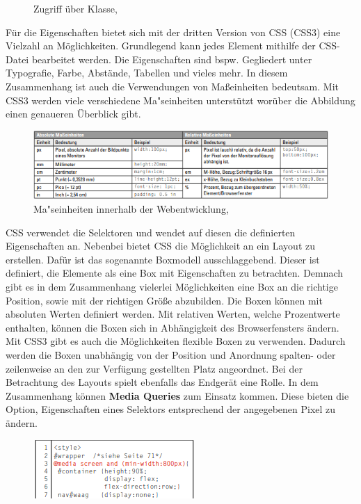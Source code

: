 \documentclass[a4paper,titlepage,halfparskip,12pt]{scrreprt}
\begin{document}
\begin{onehalfspacing}
\begin{figure}[h]
\begin{minipage}[c]{.4\textwidth}
		\caption{Zugriff über Klasse, \cite{buhler2017html5}} %
		\label{img:CSSClass}
	\end{minipage}
\end{figure}
Für die Eigenschaften bietet sich mit der dritten Version von \ac{CSS} (\ac{CSS}3) eine Vielzahl an Möglichkeiten. Grundlegend kann jedes Element mithilfe der \ac{CSS}-Datei bearbeitet werden. Die Eigenschaften sind bspw. Gegliedert unter Typografie, Farbe, Abstände, Tabellen und vieles mehr. In diesem Zusammenhang ist auch die Verwendungen von Maßeinheiten bedeutsam. Mit \ac{CSS}3 werden viele verschiedene Ma"seinheiten unterstützt worüber die Abbildung einen genaueren Überblick gibt.
\begin{figure}[h]
	\centering
	\includegraphics[scale=1.8]{images/CSSmasseinheiten}
	\caption{Ma"seinheiten innerhalb der Webentwicklung, \cite{buhler2017html5}} 
	\label{img:CSSmasseinheiten}
\end{figure}
\ac{CSS} verwendet die Selektoren und wendet auf diesen die definierten Eigenschaften an. Nebenbei bietet \ac{CSS} die Möglichkeit an ein Layout zu erstellen. Dafür ist das sogenannte Boxmodell ausschlaggebend. Dieser ist definiert, die Elemente als eine Box mit Eigenschaften zu betrachten. Demnach gibt es in dem Zusammenhang vielerlei Möglichkeiten eine Box an die richtige Position, sowie mit der richtigen Größe abzubilden. Die Boxen können mit absoluten Werten definiert werden. Mit relativen Werten, welche Prozentwerte enthalten, können die Boxen sich in Abhängigkeit des Browserfensters ändern. Mit \ac{CSS}3 gibt es auch die Möglichkeiten flexible Boxen zu verwenden. Dadurch werden die Boxen unabhängig von der Position und Anordnung spalten- oder zeilenweise an den zur Verfügung gestellten Platz angeordnet. Bei der Betrachtung des Layouts spielt ebenfalls das Endgerät eine Rolle. In dem Zusammenhang können \textbf{Media Queries} zum Einsatz kommen. Diese bieten die Option, Eigenschaften eines Selektors entsprechend der angegebenen Pixel zu ändern.
\begin{figure}[h]
	\centering
	\includegraphics[scale=2.8]{images/MediaQbsp}

\end{figure}
\end{onehalfspacing}
\end{document}
